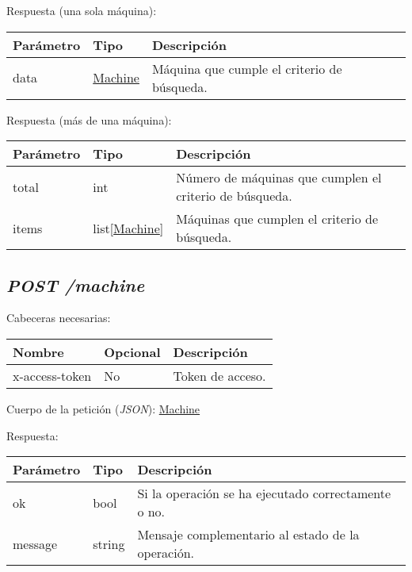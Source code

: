 Respuesta (una sola máquina):
\begin{table}[h!]
	\centering
	\begin{adjustbox}{max width=\textwidth}
	\begin{tabular}{|l|l|l|}
		\hline
		Parámetro & Tipo & Descripción \\ \hline
		data & \hyperref[sec:maquina]{Machine} & Máquina que cumple el criterio de búsqueda. \\ \hline
	\end{tabular}
\end{adjustbox}
\end{table}

Respuesta (más de una máquina):
\begin{table}[h!]
	\centering
	\begin{adjustbox}{max width=\textwidth}
	\begin{tabularx}{\linewidth}{|l|l|L|}
		\hline
		Parámetro & Tipo & Descripción \\ \hline
		total & int & Número de máquinas que cumplen el criterio de búsqueda. \\ \hline
		items & list[\hyperref[sec:maquina]{Machine}] & Máquinas que cumplen el criterio de búsqueda. \\ \hline
	\end{tabularx}
\end{adjustbox}
\end{table}



\subsection{\textit{POST /machine}}

Cabeceras necesarias:
\begin{table}[h!]
	\centering
	\begin{adjustbox}{max width=\textwidth}
	\begin{tabular}{|l|l|l|}
		\hline
		Nombre & Opcional & Descripción \\ \hline
		x-access-token & No & Token de acceso. \\ \hline
	\end{tabular}
\end{adjustbox}
\end{table}

Cuerpo de la petición (\textit{JSON}): \hyperref[sec:maquina]{Machine}

Respuesta:
\begin{table}[h!]
	\centering
	\begin{adjustbox}{max width=\textwidth}
	\begin{tabular}{|l|l|l|}
		\hline
		Parámetro & Tipo & Descripción \\ \hline
		ok & bool & Si la operación se ha ejecutado correctamente o no. \\ \hline
		message & string & Mensaje complementario al estado de la operación. \\ \hline
	\end{tabular}
\end{adjustbox}
\end{table}


